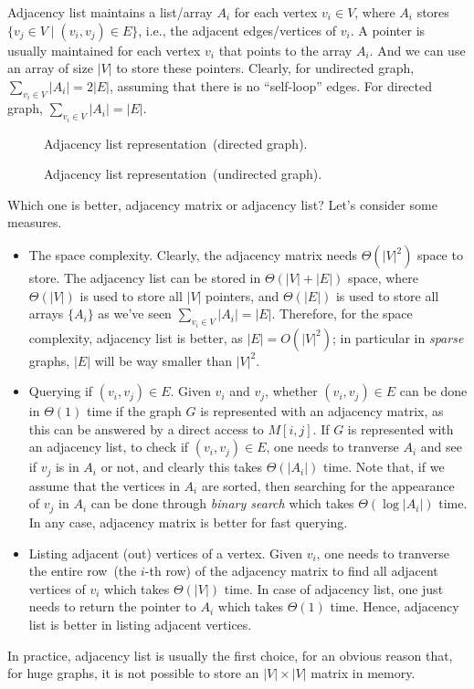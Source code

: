 Adjacency list maintains a list/array $A_i$ for each vertex $v_i \in V$, where
$A_i$ stores $\{v_j \in V \mid (v_i, v_j) \in E\}$, i.e., the adjacent edges/vertices of $v_i$.
A pointer is usually maintained for each vertex $v_i$ that points to the array $A_i$.
And we can use an array of size $|V|$ to store these pointers.
Clearly, for undirected graph, $\sum_{v_i \in V} |A_i| = 2|E|$, assuming that there is no ``self-loop'' edges.
For directed graph, $\sum_{v_i \in V} |A_i| = |E|$.

\begin{figure}[h!]
\centering{}
\caption{Adjacency list representation~(directed graph).}
\end{figure}

\begin{figure}[h!]
\centering{}
\caption{Adjacency list representation~(undirected graph).}
\end{figure}

Which one is better, adjacency matrix or adjacency list? 
Let's consider some measures.
\vspace*{-\topsep}
\begin{itemize}
\item The space complexity. Clearly, the adjacency matrix needs $\Theta(|V|^2)$ space to store.
The adjacency list can be stored in $\Theta(|V| + |E|)$ space, where $\Theta(|V|)$ is used to
store all $|V|$ pointers, and $\Theta(|E|)$ is used to store all arrays $\{A_i\}$ as we've seen
$\sum_{v_i\in V} |A_i| = |E|$. Therefore, for the space complexity, adjacency list is better,
as $|E| = O(|V|^2)$; in particular in \emph{sparse} graphs, $|E|$ will be way smaller than $|V|^2$.

\item Querying if $(v_i,v_j)\in E$. Given $v_i$ and $v_j$, whether $(v_i,v_j)\in E$ can be done
in $\Theta(1)$ time if the graph $G$ is represented with an adjacency matrix, as this can be answered
by a direct access to $M[i,j]$.
If $G$ is represented with an adjacency list, to check if $(v_i,v_j)\in E$, one needs to tranverse
$A_i$ and see if $v_j$ is in $A_i$ or not, and clearly this takes $\Theta(|A_i|)$ time.
Note that, if we assume that the vertices in $A_i$ are sorted, then searching for the appearance of $v_j$
in $A_i$ can be done through \emph{binary search} which takes $\Theta(\log |A_i|)$ time.
In any case, adjacency matrix is better for fast querying.

\item Listing adjacent (out) vertices of a vertex. Given $v_i$, one needs to tranverse the entire row~(the $i$-th row) of the adjacency matrix
to find all adjacent vertices of $v_i$ which takes $\Theta(|V|)$ time.
In case of adjacency list, one just needs to return the pointer to $A_i$ which takes $\Theta(1)$ time.
Hence, adjacency list is better in listing adjacent vertices.

\end{itemize}

In practice, adjacency list is usually the first choice, for an obvious reason that, for huge graphs, it is not possible
to store an $|V|\times |V|$ matrix in memory.


